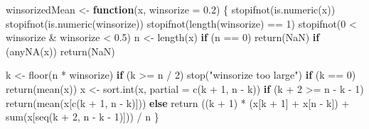 \documentclass[
]{article}
\newenvironment{Shaded}{\begin{snugshade}}{\end{snugshade}}
\newcommand{\AttributeTok}[1]{\textcolor[rgb]{0.77,0.63,0.00}{#1}}
\newcommand{\ConstantTok}[1]{\textcolor[rgb]{0.00,0.00,0.00}{#1}}
\newcommand{\ControlFlowTok}[1]{\textcolor[rgb]{0.13,0.29,0.53}{\textbf{#1}}}
\newcommand{\DecValTok}[1]{\textcolor[rgb]{0.00,0.00,0.81}{#1}}
\newcommand{\FloatTok}[1]{\textcolor[rgb]{0.00,0.00,0.81}{#1}}
\newcommand{\FunctionTok}[1]{\textcolor[rgb]{0.00,0.00,0.00}{#1}}
\newcommand{\NormalTok}[1]{#1}
\newcommand{\OtherTok}[1]{\textcolor[rgb]{0.56,0.35,0.01}{#1}}
\newcommand{\SpecialCharTok}[1]{\textcolor[rgb]{0.00,0.00,0.00}{#1}}
\newcommand{\StringTok}[1]{\textcolor[rgb]{0.31,0.60,0.02}{#1}}
\begin{document}
\begin{Shaded}
\begin{Highlighting}[]
\NormalTok{winsorizedMean }\OtherTok{\textless{}{-}} \ControlFlowTok{function}\NormalTok{(x, }\AttributeTok{winsorize =} \FloatTok{0.2}\NormalTok{) \{}
    \FunctionTok{stopifnot}\NormalTok{(}\FunctionTok{is.numeric}\NormalTok{(x))}
    \FunctionTok{stopifnot}\NormalTok{(}\FunctionTok{is.numeric}\NormalTok{(winsorize))}
    \FunctionTok{stopifnot}\NormalTok{(}\FunctionTok{length}\NormalTok{(winsorize) }\SpecialCharTok{==} \DecValTok{1}\NormalTok{)}
    \FunctionTok{stopifnot}\NormalTok{(}\DecValTok{0} \SpecialCharTok{\textless{}}\NormalTok{ winsorize }\SpecialCharTok{\&}\NormalTok{ winsorize }\SpecialCharTok{\textless{}} \FloatTok{0.5}\NormalTok{)}
\NormalTok{    n }\OtherTok{\textless{}{-}} \FunctionTok{length}\NormalTok{(x)}
    \ControlFlowTok{if}\NormalTok{ (n }\SpecialCharTok{==} \DecValTok{0}\NormalTok{) }\FunctionTok{return}\NormalTok{(}\ConstantTok{NaN}\NormalTok{)}
    \ControlFlowTok{if}\NormalTok{ (}\FunctionTok{anyNA}\NormalTok{(x)) }\FunctionTok{return}\NormalTok{(}\ConstantTok{NaN}\NormalTok{)}

\NormalTok{    k }\OtherTok{\textless{}{-}} \FunctionTok{floor}\NormalTok{(n }\SpecialCharTok{*}\NormalTok{ winsorize)}
    \ControlFlowTok{if}\NormalTok{ (k }\SpecialCharTok{\textgreater{}=}\NormalTok{ n }\SpecialCharTok{/} \DecValTok{2}\NormalTok{) }\FunctionTok{stop}\NormalTok{(}\StringTok{"winsorize too large"}\NormalTok{)}
    \ControlFlowTok{if}\NormalTok{ (k }\SpecialCharTok{==} \DecValTok{0}\NormalTok{) }\FunctionTok{return}\NormalTok{(}\FunctionTok{mean}\NormalTok{(x))}
\NormalTok{    x }\OtherTok{\textless{}{-}} \FunctionTok{sort.int}\NormalTok{(x, }\AttributeTok{partial =} \FunctionTok{c}\NormalTok{(k }\SpecialCharTok{+} \DecValTok{1}\NormalTok{, n }\SpecialCharTok{{-}}\NormalTok{ k))}
    \ControlFlowTok{if}\NormalTok{ (k }\SpecialCharTok{+} \DecValTok{2} \SpecialCharTok{\textgreater{}=}\NormalTok{ n }\SpecialCharTok{{-}}\NormalTok{ k }\SpecialCharTok{{-}} \DecValTok{1}\NormalTok{)}
        \FunctionTok{return}\NormalTok{(}\FunctionTok{mean}\NormalTok{(x[}\FunctionTok{c}\NormalTok{(k }\SpecialCharTok{+} \DecValTok{1}\NormalTok{, n }\SpecialCharTok{{-}}\NormalTok{ k)]))}
    \ControlFlowTok{else}
        \FunctionTok{return}\NormalTok{ ((k }\SpecialCharTok{+} \DecValTok{1}\NormalTok{) }\SpecialCharTok{*}\NormalTok{ (x[k }\SpecialCharTok{+} \DecValTok{1}\NormalTok{] }\SpecialCharTok{+}\NormalTok{ x[n }\SpecialCharTok{{-}}\NormalTok{ k]) }\SpecialCharTok{+}
            \FunctionTok{sum}\NormalTok{(x[}\FunctionTok{seq}\NormalTok{(k }\SpecialCharTok{+} \DecValTok{2}\NormalTok{, n }\SpecialCharTok{{-}}\NormalTok{ k }\SpecialCharTok{{-}} \DecValTok{1}\NormalTok{)])) }\SpecialCharTok{/}\NormalTok{ n}
\NormalTok{\}}
\end{Highlighting}
\end{Shaded}
\end{document}
